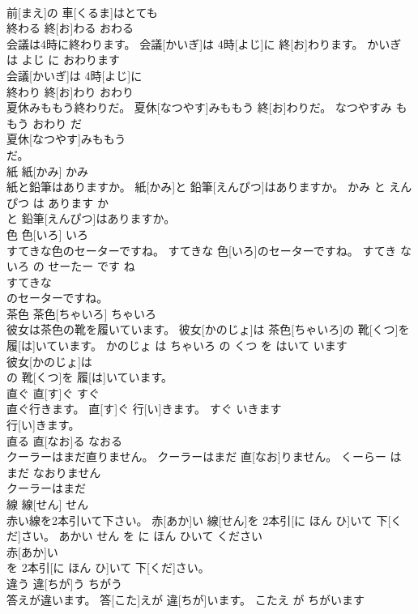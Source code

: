\documentclass[8pt]{extreport}
\begin{document}
\begin{CJK}{UTF8}{min}
\\	前[まえ]の 車[くるま]はとても
\\	終わる	終[お]わる	おわる	
\\	会議は4時に終わります。	会議[かいぎ]は 4時[よじ]に 終[お]わります。	かいぎ は よじ に おわります	
\\	会議[かいぎ]は 4時[よじ]に
\\	終わり	終[お]わり	おわり	
\\	夏休みももう終わりだ。	夏休[なつやす]みももう 終[お]わりだ。	なつやすみ も もう おわり だ	
\\	夏休[なつやす]みももう
\\	だ。			
\\	紙	紙[かみ]	かみ	
\\	紙と鉛筆はありますか。	紙[かみ]と 鉛筆[えんぴつ]はありますか。	かみ と えんぴつ は あります か	
\\	と 鉛筆[えんぴつ]はありますか。			
\\	色	色[いろ]	いろ	
\\	すてきな色のセーターですね。	すてきな 色[いろ]のセーターですね。	すてき な いろ の せーたー です ね	
\\	すてきな
\\	のセーターですね。			
\\	茶色	茶色[ちゃいろ]	ちゃいろ	
\\	彼女は茶色の靴を履いています。	彼女[かのじょ]は 茶色[ちゃいろ]の 靴[くつ]を 履[は]いています。	かのじょ は ちゃいろ の くつ を はいて います	
\\	彼女[かのじょ]は
\\	の 靴[くつ]を 履[は]いています。			
\\	直ぐ	直[す]ぐ	すぐ	
\\	直ぐ行きます。	直[す]ぐ 行[い]きます。	すぐ いきます	
\\	行[い]きます。			
\\	直る	直[なお]る	なおる	
\\	クーラーはまだ直りません。	クーラーはまだ 直[なお]りません。	くーらー は まだ なおりません	
\\	クーラーはまだ
\\	線	線[せん]	せん	
\\	赤い線を2本引いて下さい。	赤[あか]い 線[せん]を 2本引[に ほん ひ]いて 下[くだ]さい。	あかい せん を に ほん ひいて ください	
\\	赤[あか]い
\\	を 2本引[に ほん ひ]いて 下[くだ]さい。			
\\	違う	違[ちが]う	ちがう	
\\	答えが違います。	答[こた]えが 違[ちが]います。	こたえ が ちがいます	

\end{CJK}
\end{document}
